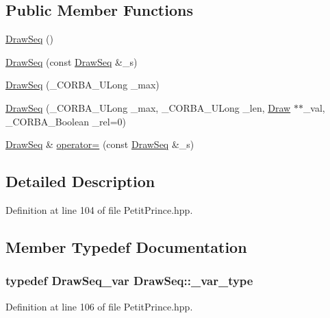 \subsection*{Public Member Functions}
\begin{DoxyCompactItemize}
\item 
\hyperlink{class_draw_seq_ab6753d8981b45e6ae4489d563853ccd3}{Draw\+Seq} ()
\item 
\hyperlink{class_draw_seq_a2f5903fb71c83ac0b55cb9d007c416f1}{Draw\+Seq} (const \hyperlink{class_draw_seq}{Draw\+Seq} \&\+\_\+s)
\item 
\hyperlink{class_draw_seq_a82f0808b50ee619fe9fbdfa9b494c58e}{Draw\+Seq} (\+\_\+\+C\+O\+R\+B\+A\+\_\+\+U\+Long \+\_\+max)
\item 
\hyperlink{class_draw_seq_a250aa6ac36a17eace7e8160a7cc04d9e}{Draw\+Seq} (\+\_\+\+C\+O\+R\+B\+A\+\_\+\+U\+Long \+\_\+max, \+\_\+\+C\+O\+R\+B\+A\+\_\+\+U\+Long \+\_\+len, \hyperlink{class_draw}{Draw} $\ast$$\ast$\+\_\+val, \+\_\+\+C\+O\+R\+B\+A\+\_\+\+Boolean \+\_\+rel=0)
\item 
\hyperlink{class_draw_seq}{Draw\+Seq} \& \hyperlink{class_draw_seq_a761bc56785aa9355562aebe6d429c19a}{operator=} (const \hyperlink{class_draw_seq}{Draw\+Seq} \&\+\_\+s)
\end{DoxyCompactItemize}


\subsection{Detailed Description}


Definition at line 104 of file Petit\+Prince.\+hpp.



\subsection{Member Typedef Documentation}
\subsubsection[{\texorpdfstring{\+\_\+var\+\_\+type}{_var_type}}]{\setlength{\rightskip}{0pt plus 5cm}typedef {\bf Draw\+Seq\+\_\+var} {\bf Draw\+Seq\+::\+\_\+var\+\_\+type}}\hypertarget{class_draw_seq_a588817eec2a28116ab4b5c32cbcdbd53}{}\label{class_draw_seq_a588817eec2a28116ab4b5c32cbcdbd53}


Definition at line 106 of file Petit\+Prince.\+hpp.



